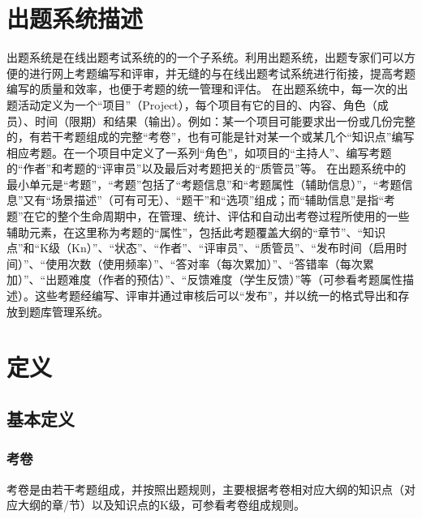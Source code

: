 \documentclass[hyperref, a4paper]{ctexart}
\begin{document}
\hypertarget{ux51faux9898ux7cfbux7edfux63cfux8ff0}{%
\section*{出题系统描述}\label{ux51faux9898ux7cfbux7edfux63cfux8ff0}}

出题系统是在线出题考试系统的的一个子系统。利用出题系统，出题专家们可以方便的进行网上考题编写和评审，并无缝的与在线出题考试系统进行衔接，提高考题编写的质量和效率，也便于考题的统一管理和评估。
在出题系统中，每一次的出题活动定义为一个``项目''（Project），每个项目有它的目的、内容、角色（成员）、时间（限期）和结果（输出）。例如：某一个项目可能要求出一份或几份完整的，有若干考题组成的完整``考卷''，也有可能是针对某一个或某几个``知识点''编写相应考题。在一个项目中定义了一系列``角色''，如项目的``主持人''、编写考题的``作者''和考题的``评审员''以及最后对考题把关的``质管员''等。
在出题系统中的最小单元是``考题''，``考题''包括了``考题信息''和``考题属性（辅助信息）''，``考题信息''又有``场景描述''（可有可无）、``题干''和``选项''组成；而``辅助信息''是指``考题''在它的整个生命周期中，在管理、统计、评估和自动出考卷过程所使用的一些辅助元素，在这里称为考题的``属性''，包括此考题覆盖大纲的``章节''、``知识点''和``K级（Kn）''、``状态''、``作者''、``评审员''、``质管员''、``发布时间（启用时间）''、``使用次数（使用频率）''、``答对率（每次累加）''、``答错率（每次累加）''、``出题难度（作者的预估）''、``反馈难度（学生反馈）''等（可参看考题属性描述）。这些考题经编写、评审并通过审核后可以``发布''，并以统一的格式导出和存放到题库管理系统。

\hypertarget{ux5b9aux4e49}{%
\section{定义}\label{ux5b9aux4e49}}

\hypertarget{ux57faux672cux5b9aux4e49}{%
\subsection{基本定义}\label{ux57faux672cux5b9aux4e49}}

\hypertarget{ux8003ux5377}{%
\subsubsection{考卷}\label{ux8003ux5377}}

考卷是由若干考题组成，并按照出题规则，主要根据考卷相对应大纲的知识点（对应大纲的章/节）以及知识点的K级，可参看考卷组成规则。
\end{document}
